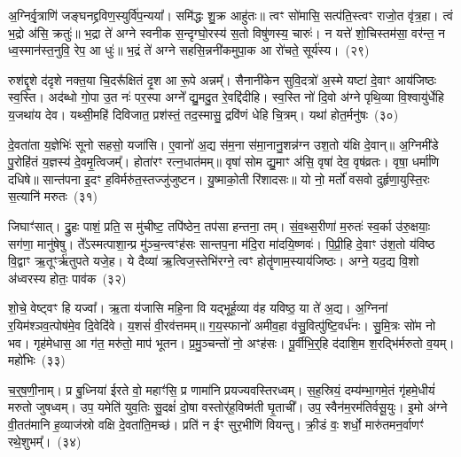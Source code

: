{\anuvakamend[{अ॒स्य॒ङ्कु॒पञ्छन्द॒स्त्रय॑स्त्रिꣳशच्च}]}%

अ॒ग्निर्वृ॒त्राणि॑ जङ्घनद्द्रविण॒स्युर्वि॑प॒न्यया᳚। समि॑द्धः शु॒क्र आहु॑तः॥ त्वꣳ सो॑मासि॒ सत्प॑ति॒स्त्वꣳ राजो॒त वृ॑त्र॒हा। त्वं भ॒द्रो अ॑सि॒ क्रतुः॑॥ भ॒द्रा ते॑ अग्ने स्वनीक स॒न्दृग्घो॒रस्य॑ स॒तो विषु॑णस्य॒ चारुः॑। न यत्ते॑ शो॒चिस्तम॑सा॒ वर॑न्त॒ न ध्व॒स्मान॑स्त॒नुवि॒ रेप॒ आ धुः॑॥ भ॒द्रं ते॑ अग्ने सहसि॒न्ननी॑कमुपा॒क आ रो॑चते॒ सूर्य॑स्य।~(२९)

रुश॑द्दृ॒शे द॑दृशे नक्त॒या चि॒दरू᳚क्षितं दृ॒श आ रू॒पे अन्नम्᳚। सैनानी॑केन सुवि॒दत्रो॑ अ॒स्मे यष्टा॑ दे॒वाꣳ आय॑जिष्ठः स्व॒स्ति। अद॑ब्धो गो॒पा उ॒त नः॑ पर॒स्पा अग्ने᳚ द्यु॒मदु॒त रे॒वद्दि॑दीहि। स्व॒स्ति नो॑ दि॒वो अ॑ग्ने पृथि॒व्या वि॒श्वायु॑र्धेहि य॒जथा॑य देव। यथ्सी॒महि॑ दिविजात॒ प्रश॑स्तं॒ तद॒स्मासु॒ द्रवि॑णं धेहि चि॒त्रम्। यथा॑ होत॒र्मनु॑षः~(३०)

दे॒वता॑ता य॒ज्ञेभिः॑ सूनो सहसो॒ यजा॑सि। ए॒वानो॑ अ॒द्य स॑म॒ना स॑मा॒नानु॒शन्न॑ग्न उश॒तो य॑क्षि दे॒वान्॥ अ॒ग्निमी॑डे पु॒रोहि॑तं य॒ज्ञस्य॑ दे॒वमृ॒त्विजम्᳚। होता॑रꣳ रत्न॒धात॑मम्॥ वृषा॑ सोम द्यु॒माꣳ अ॑सि॒ वृषा॑ देव॒ वृष॑व्रतः। वृषा॒ धर्मा॑णि दधिषे॥ सान्त॑पना इ॒दꣳ ह॒विर्मरु॑त॒स्तज्जु॑जुष्टन। यु॒ष्माको॒ती रि॑शादसः॥ यो नो॒ मर्तो॑ वसवो दुर्\mbox{}हृणा॒युस्ति॒रः स॒त्यानि॑ मरुतः~(३१)

जिघाꣳ॑सात्। द्रु॒हः पाशं॒ प्रति॒ स मु॑चीष्ट॒ तपि॑ष्ठेन॒ तप॑सा हन्तना॒ तम्। सं॒व॒थ्स॒रीणा॑ म॒रुतः॑ स्व॒र्का उ॑रु॒क्षयाः॒ सग॑णा॒ मानु॑षेषु। ते᳚\-ऽस्मत्पाशा॒न्प्र मु॑ञ्च॒न्त्वꣳह॑सः सान्तप॒ना म॑दि॒रा मा॑दयि॒ष्णवः॑। पि॒प्री॒हि दे॒वाꣳ उ॑श॒तो य॑विष्ठ वि॒द्वाꣳ ऋ॒तूꣳर्\mbox{}ऋ॑तुपते यजे॒ह। ये दैव्या॑ ऋ॒त्विज॒स्तेभि॑रग्ने॒ त्वꣳ होतॄ॑णाम॒स्याय॑जिष्ठः। अग्ने॒ यद॒द्य वि॒शो अ॑ध्वरस्य होतः॒ पाव॑क~(३२)

शो॒चे॒ वेष्ट्वꣳ हि यज्वा᳚। ऋ॒ता य॑जासि महि॒ना वि यद्भूर्\mbox{}ह॒व्या व॑ह यविष्ठ॒ या ते॑ अ॒द्य। अ॒ग्निना॑ र॒यिम॑श्ञव॒त्पोष॑मे॒व दि॒वेदि॑वे। य॒शसं॑ वी॒रव॑त्तमम्॥ ग॒य॒स्फानो॑ अमीव॒हा व॑सु॒वित्पु॑ष्टि॒वर्ध॑नः। सु॒मि॒त्रः सो॑म नो भव। गृह॑मेधास॒ आ ग॑त॒ मरु॑तो॒ माप॑ भूतन। प्र॒मु॒ञ्चन्तो॑ नो॒ अꣳह॑सः। पू॒र्वीभि॒र्॒\mbox{}हि द॑दाशि॒म श॒रद्भि॑र्मरुतो व॒यम्। महो॑भिः~(३३)

च॒र्॒\mbox{}ष॒णी॒नाम्। प्र बु॒ध्निया॑ ईरते वो॒ महाꣳ॑सि॒ प्र णामा॑नि प्रयज्यवस्तिरध्वम्। स॒ह॒स्रियं॒ दम्य॑म्भा॒गमे॒तं गृ॑हमे॒धीयं॑ मरुतो जुषध्वम्। उप॒ यमेति॑ युव॒तिः सु॒दक्षं॑ दो॒षा वस्तोर्॑\mbox{}ह॒विष्म॑ती घृ॒ताची᳚। उप॒ स्वैन॑म॒रम॑तिर्वसू॒युः। इ॒मो अ॑ग्ने वी॒तत॑मानि ह॒व्याज॑स्रो वक्षि दे॒वता॑ति॒मच्छ॑। प्रति॑ न ईꣳ सुर॒भीणि॑ वियन्तु। क्री॒डं वः॒ शर्धो॒ मारु॑तमन॒र्वाणꣳ॑ रथे॒शुभम्᳚।~(३४)

